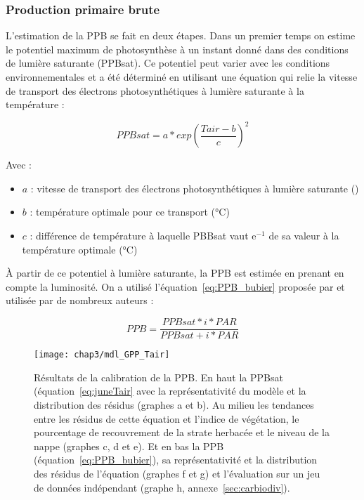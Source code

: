 \subsubsection{Production primaire brute}


L'estimation de la PPB se fait en deux étapes.
Dans un premier temps on estime le potentiel maximum de photosynthèse à un instant donné dans des conditions de lumière saturante (PPBsat).
Ce potentiel peut varier avec les conditions environnementales et a été déterminé en utilisant une équation qui relie la vitesse de transport des électrons photosynthétiques à lumière saturante à la température \citep{june2004} :

\begin{equation}\label{eq:juneTair}
PPBsat = a * exp\left(\frac{Tair - b}{c}\right)^2
\end{equation}

Avec :
\begin{itemize}
\item $a$ : vitesse de transport des électrons photosynthétiques à lumière saturante (\si{\uml})
\item $b$ : température optimale pour ce transport (\si{\degreeCelsius})
\item $c$ : différence de température à laquelle PBBsat vaut e$^{-1}$ de sa valeur à la température optimale (\si{\degreeCelsius})
\end{itemize}

À partir de ce potentiel à lumière saturante, la PPB est estimée en prenant en compte la luminosité.
On a utilisé l'équation~\ref{eq:PPB_bubier} proposée par \citep{bubier1998} et utilisée par de nombreux auteurs \citep{bortoluzzi2006a,worrall2009}:

\begin{equation} \label{eq:PPB_bubier}
PPB = \frac{PPBsat * i * PAR}{PPBsat + i * PAR}
\end{equation}

\begin{figure} %
\centering
\texttt{[image: chap3/mdl\_GPP\_Tair]}
\caption{Résultats de la calibration de la PPB. En haut la PPBsat (équation~\ref{eq:juneTair} avec la représentativité du modèle et la distribution des résidus (graphes a et b). Au milieu les tendances entre les résidus de cette équation et l'indice de végétation, le pourcentage de recouvrement de la strate herbacée et le niveau de la nappe (graphes c, d et e). Et en bas la PPB (équation~\ref{eq:PPB_bubier}), sa représentativité et la distribution des résidus de l'équation (graphes f et g) et l'évaluation sur un jeu de données indépendant (graphe h, annexe~\ref{sec:carbiodiv}).}
\label{fig:mdl_GPP_Tair}
\end{figure}

